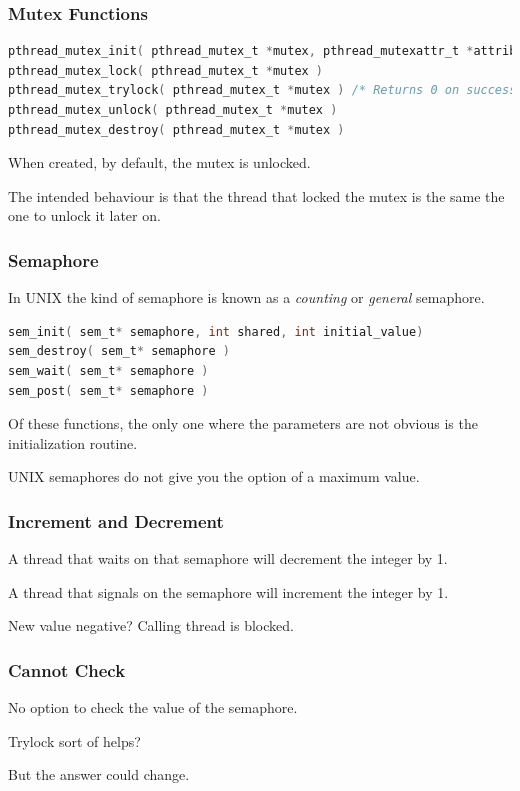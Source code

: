 \begin{frame}[fragile]
\frametitle{Mutex Functions}

\begin{lstlisting}[language=C]
pthread_mutex_init( pthread_mutex_t *mutex, pthread_mutexattr_t *attributes )
pthread_mutex_lock( pthread_mutex_t *mutex )
pthread_mutex_trylock( pthread_mutex_t *mutex ) /* Returns 0 on success */
pthread_mutex_unlock( pthread_mutex_t *mutex )
pthread_mutex_destroy( pthread_mutex_t *mutex )
\end{lstlisting}

When created, by default, the mutex is unlocked. 

The intended behaviour is that the thread that locked the mutex is the same the one to unlock it later on. 

\end{frame}

\begin{frame}[fragile]
\frametitle{Semaphore}
In UNIX the kind of semaphore is known as a \textit{counting} or \textit{general} semaphore.

\begin{lstlisting}[language=C]
sem_init( sem_t* semaphore, int shared, int initial_value)
sem_destroy( sem_t* semaphore )
sem_wait( sem_t* semaphore )
sem_post( sem_t* semaphore )
\end{lstlisting}

Of these functions, the only one where the parameters are not obvious is the initialization routine. 

UNIX semaphores do not give you the option of a maximum value.

\end{frame}

\begin{frame}
\frametitle{Increment and Decrement}

A thread that waits on that semaphore will decrement the integer by 1. 

A thread that signals on the semaphore will increment the integer by 1.

New value negative? Calling thread is blocked.

\end{frame}

\begin{frame}
\frametitle{Cannot Check}

No option to check the value of the semaphore.

Trylock sort of helps?

But the answer could change.

\end{frame}

